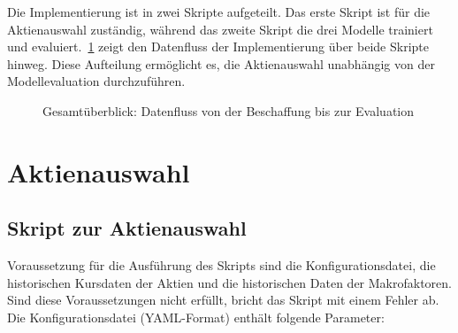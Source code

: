 Die Implementierung ist in zwei Skripte aufgeteilt. Das erste Skript ist für die Aktienauswahl zuständig, während das zweite Skript die drei Modelle trainiert und evaluiert.~\cref{fig:gesamtueberblick_datenfluss} zeigt den Datenfluss der Implementierung über beide Skripte hinweg. Diese Aufteilung ermöglicht es, die Aktienauswahl unabhängig von der Modellevaluation durchzuführen.
\begin{figure}[htbp]
    \centering
    
    \caption{Gesamtüberblick: Datenfluss von der Beschaffung bis zur Evaluation}\label{fig:gesamtueberblick_datenfluss}
\end{figure}

\section{Aktienauswahl}\label{sec:impl_aktienauswahl}

\subsection{Skript zur Aktienauswahl}\label{subsec:skript_aktienauswahl}
Voraussetzung für die Ausführung des Skripts sind die Konfigurationsdatei, die historischen Kursdaten der Aktien und die historischen Daten der Makrofaktoren. Sind diese Voraussetzungen nicht erfüllt, bricht das Skript mit einem Fehler ab. Die Konfigurationsdatei (YAML-Format) enthält folgende Parameter:

